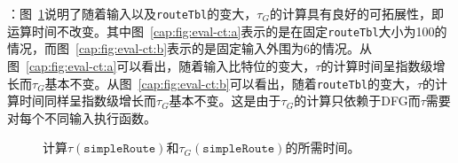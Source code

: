 \documentclass{ctexart}
\newcommand{\para}[1]{\smallskip\noindent {\bf #1}}
\begin{document}
\para{结果}：图~\ref{cap:fig:eval-ct}说明了随着输入以及\texttt{routeTbl}的变大，$\tau_G$的计算具有良好的可拓展性，即运算时间不改变。其中图~\ref{cap:fig:eval-ct:a}表示的是在固定\texttt{routeTbl}大小为100的情况，而图~\ref{cap:fig:eval-ct:b}表示的是固定输入外围为6的情况。从图~\ref{cap:fig:eval-ct:a}可以看出，随着输入比特位的变大，$\tau$的计算时间呈指数级增长而$\tau_G$基本不变。从图~\ref{cap:fig:eval-ct:b}可以看出，随着\texttt{routeTbl}的变大，$\tau$的计算时间同样呈指数级增长而$\tau_G$基本不变。这是由于$\tau_G$的计算只依赖于DFG而$\tau$需要对每个不同输入执行函数。




\begin{figure}
  \centering
  \hspace{1in}
  \caption{计算$\tau(\texttt{simpleRoute})$和$\tau_G(\texttt{simpleRoute})$的所需时间。}
  \label{cap:fig:eval-ct}
\end{figure}
\end{document}

